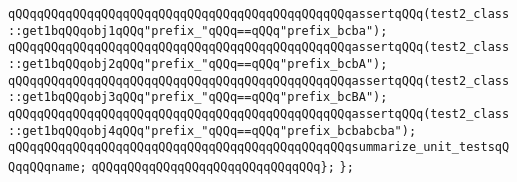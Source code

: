 \verb|qQQqqQQqqQQqqQQqqQQqqQQqqQQqqQQqqQQqqQQqqQQqqQQqassertqQQq(test2_class::get1bqQQqobj1qQQq"prefix_"qQQq==qQQq"prefix_bcba");|\newline
\verb|qQQqqQQqqQQqqQQqqQQqqQQqqQQqqQQqqQQqqQQqqQQqqQQqassertqQQq(test2_class::get1bqQQqobj2qQQq"prefix_"qQQq==qQQq"prefix_bcbA");|\newline
\verb|qQQqqQQqqQQqqQQqqQQqqQQqqQQqqQQqqQQqqQQqqQQqqQQqassertqQQq(test2_class::get1bqQQqobj3qQQq"prefix_"qQQq==qQQq"prefix_bcBA");|\newline
\verb|qQQqqQQqqQQqqQQqqQQqqQQqqQQqqQQqqQQqqQQqqQQqqQQqassertqQQq(test2_class::get1bqQQqobj4qQQq"prefix_"qQQq==qQQq"prefix_bcbabcba");|\newline
\newline
\verb|qQQqqQQqqQQqqQQqqQQqqQQqqQQqqQQqqQQqqQQqqQQqqQQqsummarize_unit_testsqQQqqQQqname;|\newline
\verb|qQQqqQQqqQQqqQQqqQQqqQQqqQQqqQQq};|\newline
\verb|};|\newline
\newline

